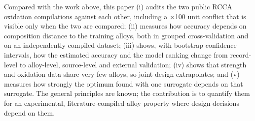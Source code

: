 Compared with the work above, this paper
(i) audits the two public RCCA oxidation compilations against each other, including a $\times$100 unit
conflict that is visible only when the two are compared;
(ii) measures how accuracy depends on composition distance to the training alloys, both in grouped
cross-validation and on an independently compiled dataset;
(iii) shows, with bootstrap confidence intervals, how the estimated accuracy and the model ranking change
from record-level to alloy-level, source-level and external validation;
(iv) shows that strength and oxidation data share very few alloys, so joint design extrapolates; and
(v) measures how strongly the optimum found with one surrogate depends on that surrogate.
The general principles are known; the contribution is to quantify them for an experimental,
literature-compiled alloy property where design decisions depend on them.
